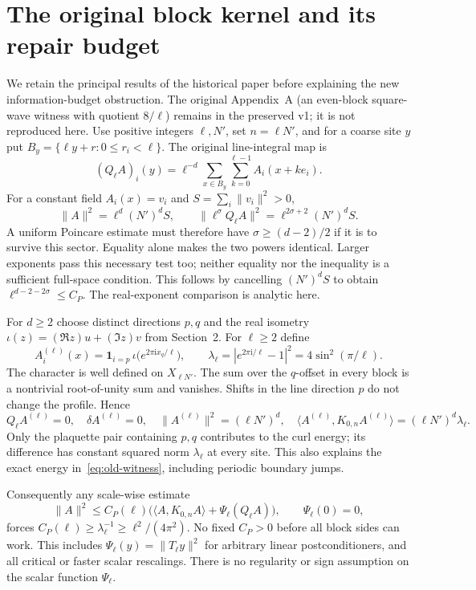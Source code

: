 \documentclass[11pt]{article}
\newcommand{\ip}[2]{\langle #1,#2\rangle}
\begin{document}
\section{The original block kernel and its repair budget}\label{sec:old}
We retain the principal results of the historical paper \cite{eriksson}
before explaining the new information-budget obstruction. The original
Appendix~A (an even-block square-wave witness with quotient $8/\ell$) remains
in the preserved v1; it is not reproduced here. Use positive integers
$\ell,N'$, set $n=\ell N'$, and for a coarse site $y$ put
$B_y=\{\ell y+r:0\leq r_i<\ell\}$. The original line-integral map is
\[
 (Q_\ell A)_i(y)=\ell^{-d}\sum_{x\in B_y}\sum_{k=0}^{\ell-1}A_i(x+ke_i).
\]
For a constant field $A_i(x)=v_i$ and $S=\sum_i\|v_i\|^2>0$,
\[
 \|A\|^2=\ell^d(N')^dS,\qquad
 \|\ell^\sigma Q_\ell A\|^2=\ell^{2\sigma+2}(N')^dS.
\]
A uniform Poincare estimate must therefore have
$\sigma\geq(d-2)/2$ if it is to survive this sector. Equality alone makes
the two powers identical. Larger exponents pass this necessary test too;
neither equality nor the inequality is a sufficient full-space condition.
This follows by cancelling $(N')^dS$ to obtain
$\ell^{d-2-2\sigma}\leq C_P$. The real-exponent comparison is analytic here.

For $d\geq2$ choose distinct directions $p,q$ and the real isometry
$\iota(z)=(\Re z)u+(\Im z)v$ from Section~2. For $\ell\geq2$ define
\[
 A^{(\ell)}_i(x)=\mathbf1_{i=p}\,
 \iota\bigl(e^{2\pi\mathrm i x_q/\ell}\bigr),\qquad
 \lambda_\ell=|e^{2\pi\mathrm i/\ell}-1|^2
             =4\sin^2(\pi/\ell).
\]
The character is well defined on $X_{\ell N'}$. The sum over the $q$-offset
in every block is a nontrivial root-of-unity sum and vanishes. Shifts in the
line direction $p$ do not change the profile. Hence
\begin{equation}\label{eq:old-witness}
 Q_\ell A^{(\ell)}=0,\quad \delta A^{(\ell)}=0,\quad
 \|A^{(\ell)}\|^2=(\ell N')^d,\quad
 \ip{A^{(\ell)}}{K_{0,n}A^{(\ell)}}=(\ell N')^d\lambda_\ell.
\end{equation}
Only the plaquette pair containing $p,q$ contributes to the curl energy;
its difference has constant squared norm $\lambda_\ell$ at every site.
This also explains the exact energy in~\eqref{eq:old-witness}, including
periodic boundary jumps.

Consequently any scale-wise estimate
\[
 \|A\|^2\leq C_P(\ell)\bigl(\ip{A}{K_{0,n}A}+\Psi_\ell(Q_\ell A)\bigr),
 \qquad \Psi_\ell(0)=0,
\]
forces $C_P(\ell)\geq\lambda_\ell^{-1}\geq\ell^2/(4\pi^2)$.
No fixed $C_P>0$ before all block sides can work. This includes
$\Psi_\ell(y)=\|T_\ell y\|^2$ for arbitrary linear postconditioners, and
all critical or faster scalar rescalings. There is no regularity or sign
assumption on the scalar function $\Psi_\ell$.
\end{document}

